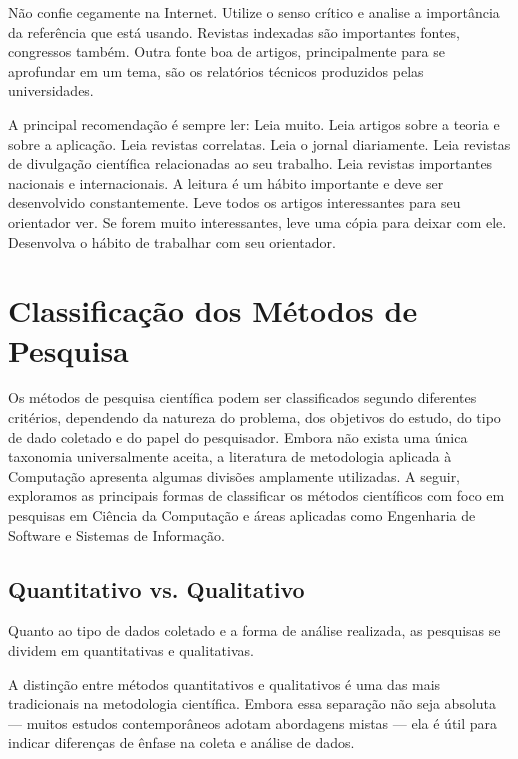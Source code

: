 
Não confie cegamente na Internet.  Utilize o senso crítico e analise a importância da referência que está usando. Revistas indexadas são importantes fontes, congressos também. Outra fonte boa de artigos, principalmente para se aprofundar em um tema, são os relatórios técnicos produzidos pelas universidades. 

A principal recomendação é sempre ler: Leia muito. Leia artigos sobre a teoria e sobre a aplicação. Leia revistas correlatas. Leia o jornal diariamente. Leia revistas de divulgação científica relacionadas ao seu trabalho. Leia revistas importantes nacionais e internacionais. A leitura é um hábito importante e deve ser desenvolvido constantemente. Leve todos os artigos interessantes para seu orientador ver. Se forem muito interessantes, leve uma cópia para deixar com ele. Desenvolva o hábito de trabalhar com seu orientador. 





\section{Classificação dos Métodos de Pesquisa}

Os métodos de pesquisa científica podem ser classificados segundo diferentes critérios, dependendo da natureza do problema, dos objetivos do estudo, do tipo de dado coletado e do papel do pesquisador. Embora não exista uma única taxonomia universalmente aceita, a literatura de metodologia aplicada à Computação apresenta algumas divisões amplamente utilizadas. 
A seguir, exploramos as principais formas de classificar os métodos científicos com foco em pesquisas em Ciência da Computação e áreas aplicadas como Engenharia de Software e Sistemas de Informação.

\subsection{Quantitativo vs. Qualitativo}

Quanto ao tipo de dados coletado e a forma de análise realizada, as pesquisas se dividem em quantitativas e qualitativas.

A distinção entre métodos quantitativos e qualitativos é uma das mais tradicionais na metodologia científica. Embora essa separação não seja absoluta — muitos estudos contemporâneos adotam abordagens mistas — ela é útil para indicar diferenças de ênfase na coleta e análise de dados.

